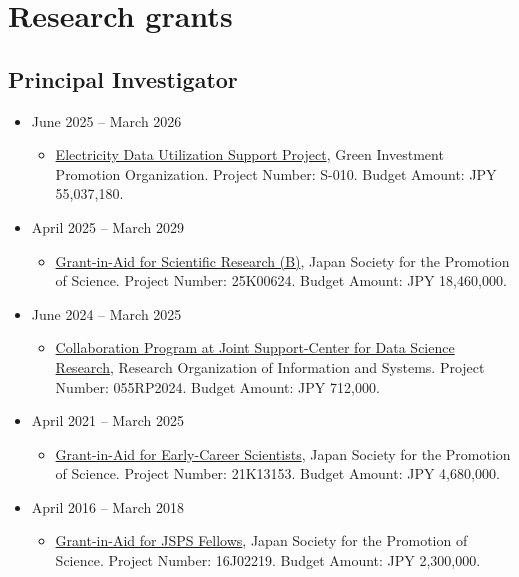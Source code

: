 \documentclass[
]{book}
\providecommand{\tightlist}{%
  \setlength{\itemsep}{0pt}\setlength{\parskip}{0pt}}
\begin{document}
\section*{Research grants}\label{research-grants}

\subsection*{Principal Investigator}\label{principal-investigator}

\begin{itemize}
\tightlist
\item
  June 2025 -- March 2026

  \begin{itemize}
  \tightlist
  \item
    \href{https://www.teitanso.or.jp/smamedata/download/}{Electricity Data Utilization Support Project},
    Green Investment Promotion Organization.
    Project Number: S-010. Budget Amount: JPY 55,037,180.
  \end{itemize}
\item
  April 2025 -- March 2029

  \begin{itemize}
  \tightlist
  \item
    \href{https://kaken.nii.ac.jp/en/grant/KAKENHI-PROJECT-25K00624/}{Grant-in-Aid for Scientific Research (B)},
    Japan Society for the Promotion of Science.
    Project Number: 25K00624. Budget Amount: JPY 18,460,000.
  \end{itemize}
\item
  June 2024 -- March 2025

  \begin{itemize}
  \tightlist
  \item
    \href{(https://ds.rois.ac.jp/article/2024_rois-ds-joint_result)}{Collaboration Program at Joint Support-Center for Data Science Research},
    Research Organization of Information and Systems.
    Project Number: 055RP2024. Budget Amount: JPY 712,000.
  \end{itemize}
\item
  April 2021 -- March 2025

  \begin{itemize}
  \tightlist
  \item
    \href{https://kaken.nii.ac.jp/en/grant/KAKENHI-PROJECT-21K13153/}{Grant-in-Aid for Early-Career Scientists},
    Japan Society for the Promotion of Science.
    Project Number: 21K13153. Budget Amount: JPY 4,680,000.
  \end{itemize}
\item
  April 2016 -- March 2018

  \begin{itemize}
  \tightlist
  \item
    \href{https://kaken.nii.ac.jp/en/grant/KAKENHI-PROJECT-16J02219/}{Grant-in-Aid for JSPS Fellows},
    Japan Society for the Promotion of Science.
    Project Number: 16J02219. Budget Amount: JPY 2,300,000.
  \end{itemize}
\end{itemize}
\end{document}
